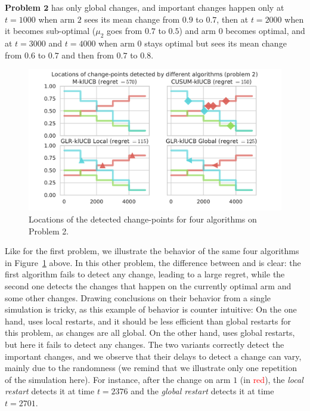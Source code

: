 \textbf{Problem $\bm{2}$} has only global changes, and important changes happen only at $t=1000$ when arm $2$ sees its mean change from $0.9$ to $0.7$, then at $t=2000$ when it becomes sub-optimal ($\mu_2$ goes from $0.7$ to $0.5$) and arm $0$ becomes optimal, and at $t=3000$ and $t=4000$ when arm $0$ stays optimal but sees its mean change from $0.6$ to $0.7$ and then from $0.7$ to $0.8$.

\begin{figure}[h!]  %
    \centering
    \includegraphics[width=1.00\linewidth]{2-Chapters/6-Chapter/Images/Visualizing_locations_of_change_points_for_different_algorithms__4algs_Pb2.pdf}
    \caption{Locations of the detected change-points for four algorithms on Problem 2.}
    \label{fig:6:Visualizing_locations_of_change_points_for_different_algorithms__4algs_Pb2}
\end{figure}

Like for the first problem, we illustrate the behavior of the same four algorithms in Figure~\ref{fig:6:Visualizing_locations_of_change_points_for_different_algorithms__4algs_Pb2} above.
In this other problem, the difference between \MklUCB{} and \CUSUMklUCB{} is clear:
the first algorithm fails to detect any change, leading to a large regret,
while the second one detects the changes that happen on the currently optimal arm and some other changes.
Drawing conclusions on their behavior from a single simulation is tricky, as this example of behavior is counter intuitive:
On the one hand, \CUSUM{} uses local restarts, and it should be less efficient than global restarts for this problem, as changes are all global.
On the other hand, \MklUCB{} uses global restarts, but here it fails to detect any changes.
%
The two \GLRklUCB{} variants correctly detect the important changes, and we observe that their delays to detect a change can vary, mainly due to the randomness (we remind that we illustrate only one repetition of the simulation here).
For instance, after the change on arm $1$ (in \textcolor{red}{red}), the \emph{local restart} detects it at time $t=2376$ and the \emph{global restart} detects it at time $t=2701$.

